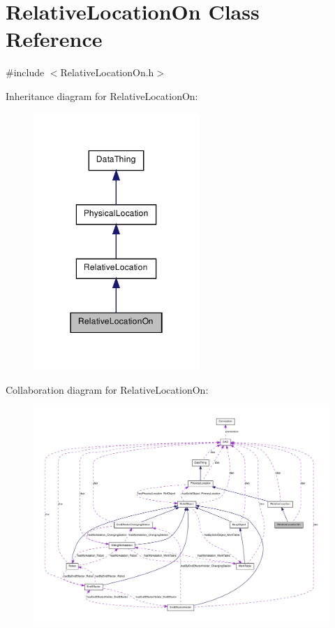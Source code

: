 \hypertarget{class_relative_location_on}{
\section{RelativeLocationOn Class Reference}
\label{class_relative_location_on}
}


{\ttfamily \#include $<$RelativeLocationOn.h$>$}



Inheritance diagram for RelativeLocationOn:\nopagebreak
\begin{figure}[H]
\begin{center}
\leavevmode
\includegraphics[width=178pt]{class_relative_location_on__inherit__graph}
\end{center}
\end{figure}


Collaboration diagram for RelativeLocationOn:\nopagebreak
\begin{figure}[H]
\begin{center}
\leavevmode
\includegraphics[width=400pt]{class_relative_location_on__coll__graph}
\end{center}
\end{figure}
